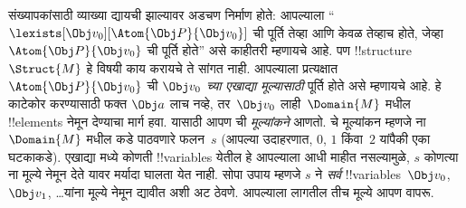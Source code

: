 \documentclass[../../../include/open-logic-section]{subfiles}
\begin{document}
संख्यापकांसाठी व्याख्या द्यायची झाल्यावर अडचण निर्माण होते: आपल्याला
``$\lexists[\Obj v_0][\Atom{\Obj P}{\Obj v_0}]$ ची पूर्ति तेव्हा आणि
केवळ तेव्हाच होते, जेव्हा $\Atom{\Obj P}{\Obj v_0}$ ची पूर्ति होते''
असे काहीतरी म्हणायचे आहे. पण !!{structure}~$\Struct{M}$ हे
विषयी काय करायचे ते सांगत नाही. आपल्याला प्रत्यक्षात
$\Atom{\Obj P}{\Obj v_0}$ ची \emph{$\Obj v_0$ च्या एखाद्या मूल्यासाठी}
पूर्ति होते असे म्हणायचे आहे. हे काटेकोर करण्यासाठी फक्त $\Obj a$ लाच
नव्हे, तर~$\Obj v_0$ लाही~$\Domain{M}$ मधील !!{element}s नेमून देण्याचा
मार्ग हवा. यासाठी आपण ची \emph{मूल्यांकने} आणतो.
चे मूल्यांकन म्हणजे ना~$\Domain{M}$ मधील
कडे पाठवणारे फलन~$s$ (आपल्या उदाहरणात, $0$, $1$ किंवा~$2$
यांपैकी एका घटकाकडे). एखाद्या मध्ये कोणती !!{variable}s
येतील हे आपल्याला आधी माहीत नसल्यामुळे, $s$ कोणत्या ना
मूल्ये नेमून देते यावर मर्यादा घालता येत नाही. सोपा उपाय म्हणजे $s$ ने
\emph{सर्व} !!{variable}s~$\Obj v_0$, $\Obj v_1$, \dots\@ यांना मूल्ये
नेमून द्यावीत अशी अट ठेवणे. आपल्याला लागतील तीच मूल्ये आपण वापरू.
%
\end{document}
